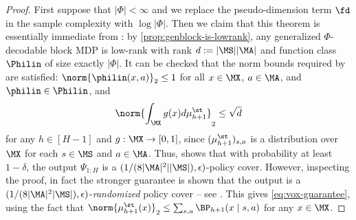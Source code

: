 \begin{proof}
First suppose that $|\Phi| < \infty$ and we replace the pseudo-dimension term $\fd$ in the sample complexity with $\log |\Phi|$. Then we claim that this theorem is essentially immediate from \cite[Theorem 3.2]{mhammedi2023efficient}: by \cref{prop:genblock-is-lowrank}, any generalized $\Phi$-decodable block MDP is low-rank with rank $d := |\MS||\MA|$ and function class $\Philin$ of size exactly $|\Phi|$. It can be checked that the norm bounds required by \cite{mhammedi2023efficient} are satisfied: $\norm{\philin(x,a)}_2 \leq 1$ for all $x\in\MX$, $a \in \MA$, and $\philin\in\Philin$, and 
\[\norm{\int_\MX g(x) d\mu^\st_{h+1}}_2 \leq \sqrt{d}\]
for any $h \in [H-1]$ and $g: \MX \to [0,1]$, since $(\mu^\st_{h+1})_{s,a}$ is a distribution over $\MX$ for each $s\in\MS$ and $a \in \MA$. Thus, \cite[Theorem 3.2]{mhammedi2023efficient} shows that with probability at least $1-\delta$, the output $\Psi_{1:H}$ is a $(1/(8|\MA|^2||\MS|),\epsilon)$-policy cover. However, inspecting the proof, in fact the stronger guarantee is shown that the output is a $(1/(8|\MA|^2|\MS|), \epsilon)$-\emph{randomized} policy cover \--- see \cite[Definition 2.2]{mhammedi2023efficient}. This gives \cref{eq:vox-guarantee}, using the fact that $\norm{\mu^\st_{h+1}(x)}_2 \leq \sum_{s,a} \BP_{h+1}(x\mid{}s,a)$ for any $x \in \MX$.


\end{proof}
